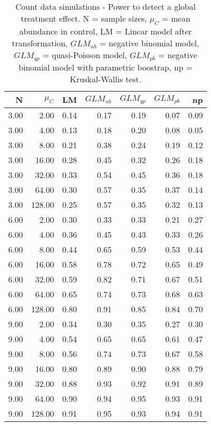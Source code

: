 \begin{table}[H]
\centering
\caption{Count data simulations - Power to detect a global treatment effect. N = sample sizes, 
             $\mu_C$ = mean abundance in control, LM = Linear model after transformation, 
             $GLM_{nb}$ = negative binomial model, $GLM_{qp}$ = quasi-Poisson model, 
             $GLM_{pb}$ = negative binomial model with parametric boostrap, np = Kruskal-Wallis test.} 
\label{tab:pow_glob_c}
{\footnotesize
\begin{tabular}{rrrrrrr}
  \hline
N & $\mu_C$ & LM & $GLM_{nb}$ & $GLM_{qp}$ & $GLM_{pb}$ & np \\ 
  \hline
3.00 & 2.00 & 0.14 & 0.17 & 0.19 & 0.07 & 0.09 \\ 
  3.00 & 4.00 & 0.13 & 0.18 & 0.20 & 0.08 & 0.05 \\ 
  3.00 & 8.00 & 0.21 & 0.38 & 0.24 & 0.19 & 0.12 \\ 
  3.00 & 16.00 & 0.28 & 0.45 & 0.32 & 0.26 & 0.18 \\ 
  3.00 & 32.00 & 0.33 & 0.54 & 0.45 & 0.36 & 0.18 \\ 
  3.00 & 64.00 & 0.30 & 0.57 & 0.35 & 0.37 & 0.14 \\ 
  3.00 & 128.00 & 0.25 & 0.57 & 0.35 & 0.32 & 0.13 \\ 
  6.00 & 2.00 & 0.30 & 0.33 & 0.33 & 0.21 & 0.27 \\ 
  6.00 & 4.00 & 0.36 & 0.45 & 0.43 & 0.33 & 0.26 \\ 
  6.00 & 8.00 & 0.44 & 0.65 & 0.59 & 0.53 & 0.44 \\ 
  6.00 & 16.00 & 0.58 & 0.78 & 0.72 & 0.65 & 0.49 \\ 
  6.00 & 32.00 & 0.59 & 0.82 & 0.71 & 0.67 & 0.51 \\ 
  6.00 & 64.00 & 0.65 & 0.74 & 0.73 & 0.68 & 0.63 \\ 
  6.00 & 128.00 & 0.80 & 0.91 & 0.85 & 0.84 & 0.70 \\ 
  9.00 & 2.00 & 0.34 & 0.30 & 0.35 & 0.27 & 0.30 \\ 
  9.00 & 4.00 & 0.54 & 0.65 & 0.65 & 0.61 & 0.47 \\ 
  9.00 & 8.00 & 0.56 & 0.74 & 0.73 & 0.67 & 0.58 \\ 
  9.00 & 16.00 & 0.80 & 0.89 & 0.90 & 0.88 & 0.79 \\ 
  9.00 & 32.00 & 0.88 & 0.93 & 0.92 & 0.91 & 0.89 \\ 
  9.00 & 64.00 & 0.90 & 0.94 & 0.95 & 0.93 & 0.91 \\ 
  9.00 & 128.00 & 0.91 & 0.95 & 0.93 & 0.94 & 0.91 \\ 
   \hline
\end{tabular}
}
\end{table}

